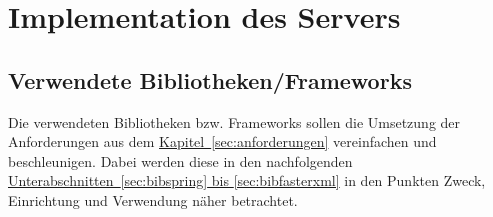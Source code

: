 
\chapter{Implementation des Servers}


\section{Verwendete Bibliotheken/Frameworks}
Die verwendeten Bibliotheken bzw. Frameworks sollen die Umsetzung der Anforderungen aus dem \hyperref[sec:anforderungen]{Kapitel~\ref{sec:anforderungen}} vereinfachen und beschleunigen. Dabei werden diese in den nachfolgenden \hyperref[sec:bibspring, sec:bibfasterxml]{Unterabschnitten~\ref{sec:bibspring} bis \ref{sec:bibfasterxml}} in den Punkten Zweck, Einrichtung und Verwendung näher betrachtet. 

